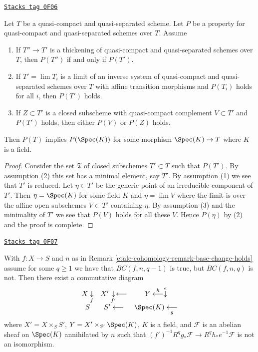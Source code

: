 \begin{lemma}
\label{etale-cohomology-lemma-formal-argument}
\href{https://stacks.math.columbia.edu/tag/0F06}{\texttt{Stacks tag 0F06}}

Let $T$ be a quasi-compact and quasi-separated scheme.
Let $P$ be a property for quasi-compact and quasi-separated
schemes over $T$. Assume
\begin{enumerate}
\item If $T'' \to T'$ is a thickening of quasi-compact and
quasi-separated schemes over $T$, then $P(T'')$ if and only if $P(T')$.
\item If $T' = \lim T_i$ is a limit of an inverse system of
quasi-compact and quasi-separated schemes over $T$ with affine
transition morphisms and $P(T_i)$ holds for all $i$, then
$P(T')$ holds.
\item If $Z \subset T'$ is a closed subscheme with
quasi-compact complement $V \subset T'$ and $P(T')$ holds,
then either $P(V)$ or $P(Z)$ holds.
\end{enumerate}
Then $P(T)$ implies $P(\Spec(K))$ for some morphism $\Spec(K) \to T$
where $K$ is a field.
\end{lemma}

\begin{proof}
Consider the set $\mathfrak T$ of closed subschemes $T' \subset T$
such that $P(T')$. By assumption (2) this set has a minimal element,
say $T'$. By assumption (1) we see that $T'$ is reduced.
Let $\eta \in T'$ be the generic point of an irreducible
component of $T'$. Then $\eta = \Spec(K)$ for some field
$K$ and $\eta = \lim V$ where the limit is over the affine
open subschemes $V \subset T'$ containing $\eta$.
By assumption (3) and the minimality of $T'$ we see
that $P(V)$ holds for all these $V$. Hence $P(\eta)$
by (2) and the proof is complete.
\end{proof}

\begin{lemma}
\label{etale-cohomology-lemma-base-change-does-not-hold-pre}
\href{https://stacks.math.columbia.edu/tag/0F07}{\texttt{Stacks tag 0F07}}

With $f : X \to S$ and $n$ as in Remark \ref{etale-cohomology-remark-base-change-holds}
assume for some $q \geq 1$ we have that $BC(f, n, q - 1)$ is true, but
$BC(f, n, q)$ is not. Then there exist a commutative diagram
$$
\begin{array}{ccc}X \underset{f}{\downarrow} & X' \underset{f'}{\downarrow}\longleftarrow & Y \overset{h}{\longleftarrow}\overset{e}{\downarrow} \\ S & S' \longleftarrow & \Spec(K) \underset{g}{\longleftarrow}\end{array}
$$
where $X' = X \times_S S'$, $Y = X' \times_{S'} \Spec(K)$,
$K$ is a field, and $\mathcal{F}$ is an abelian sheaf
on $\Spec(K)$ annihilated by $n$ such that
$(f')^{-1}R^qg_*\mathcal{F} \to R^qh_*e^{-1}\mathcal{F}$
is not an isomorphism.
\end{lemma}

